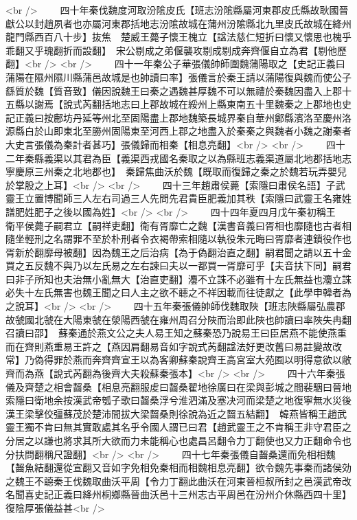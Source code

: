<br />
　　四十年秦伐魏度河取汾隂皮氏【班志汾隂縣屬河東郡皮氏縣故耿國晉獻公以封趙夙者也亦屬河東郡括地志汾隂故城在蒲州汾隂縣北九里皮氏故城在絳州龍門縣西百八十步】抜焦　楚威王薨子懷王槐立【諡法慈仁短折曰懷又懷思也槐乎乖翻又乎瑰翻折而設翻】　宋公剔成之弟偃襲攻剔成剔成奔齊偃自立為君【剔他歷翻】<br />
<br />
　　四十一年秦公子華張儀帥師圍魏蒲陽取之【史記正義曰蒲陽在隰州隰川縣蒲邑故城是也帥讀曰率】張儀言於秦王請以蒲陽復與魏而使公子繇質於魏【質音致】儀因說魏王曰秦之遇魏甚厚魏不可以無禮於秦魏因盡入上郡十五縣以謝焉【說式芮翻括地志曰上郡故城在綏州上縣東南五十里魏秦之上郡地也史記正義曰按鄜坊丹延等州北至固陽盡上郡地魏築長城界秦自華州鄭縣濱洛至慶州洛源縣白於山即東北至勝州固陽東至河西上郡之地盡入於秦秦之與魏者小魏之謝秦者大史言張儀為秦計者甚巧】張儀歸而相秦【相息亮翻】<br />
<br />
　　四十二年秦縣義渠以其君為臣【義渠西戎國名秦取之以為縣班志義渠道屬北地郡括地志寧慶原三州秦之北地郡也】　秦歸焦曲沃於魏【既取而復歸之秦之於魏若玩弄嬰兒於掌股之上耳】<br />
<br />
　　四十三年趙肅侯薨【索隱曰肅侯名語】子武靈王立置博聞師三人左右司過三人先問先君貴臣肥義加其秩【索隱曰武靈王名雍姓譜肥姓肥子之後以國為姓】<br />
<br />
　　四十四年夏四月戊午秦初稱王　衛平侯薨子嗣君立【嗣祥吏翻】衛有胥靡亡之魏【漢書音義曰胥相也靡隨也古者相隨坐輕刑之名謂罪不至於朴刑者令衣褐帶索相隨以執役朱元晦曰胥靡者連鎻役作也胥新於翻靡母被翻】因為魏王之后治病【為于偽翻治直之翻】嗣君聞之請以五十金買之五反魏不與乃以左氏易之左右諫曰夫以一都買一胥靡可乎【夫音扶下同】嗣君曰非子所知也夫治無小亂無大【治直吏翻】灋不立誅不必雖有十左氏無益也灋立誅必失十左氏無害也魏王聞之曰人主之欲不聼之不祥因載而往徒獻之【此學申韓者為之說耳】<br />
<br />
　　四十五年秦張儀帥師伐魏取陜【班志陜縣屬弘農郡故虢國北虢在大陽東虢在滎陽西虢在雍州周召分陜而治即此陜也帥讀曰率陜失冉翻召讀曰邵】　蘇秦通於燕文公之夫人易王知之蘇秦恐乃說易王曰臣居燕不能使燕重而在齊則燕重易王許之【燕因肩翻易音如字說式芮翻諡法好更改舊曰易註變故改常】乃偽得罪於燕而奔齊齊宣王以為客卿蘇秦說齊王高宮室大苑囿以明得意欲以敝齊而為燕【說式芮翻為後齊大夫殺蘇秦張本】<br />
<br />
　　四十六年秦張儀及齊楚之相會齧桑【相息亮翻服䖍曰齧桑翟地徐廣曰在梁與彭城之間裴駰曰晉地索隱曰衛地余按漢武帝瓠子歌曰齧桑浮兮淮泗滿及塞决河而梁楚之地復寧無水災後漢王梁擊佼彊蘇茂於楚沛間拔大梁齧桑則徐說為近之齧五結翻】　韓燕皆稱王趙武靈王獨不肯曰無其實敢處其名乎令國人謂已曰君【趙武靈王之不肯稱王非守君臣之分居之以謙也將求其所大欲而力未能稱心也處昌呂翻令力丁翻使也又力正翻命令也分扶問翻稱尺證翻】<br />
<br />
　　四十七年秦張儀自齧桑還而免相相魏【齧魚結翻還從宣翻又音如字免相免秦相而相魏相息亮翻】欲令魏先事秦而諸侯効之魏王不聼秦王伐魏取曲沃平周【令力丁翻此曲沃在河東晉桓叔所封之邑漢武帝改名聞喜史記正義曰絳州桐鄉縣晉曲沃邑十三州志古平周邑在汾州介休縣西四十里】復陰厚張儀益甚<br />
